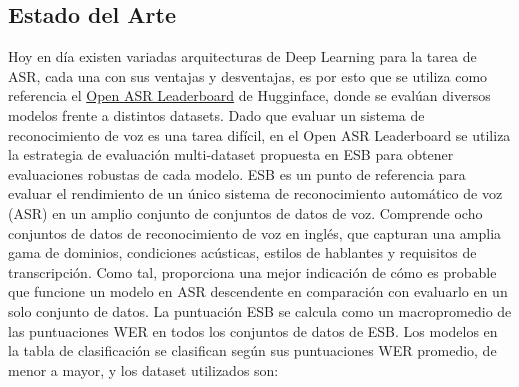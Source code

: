 \documentclass[conference]{IEEEtran}
\begin{document}
\subsection{Estado del Arte}
Hoy en día existen variadas arquitecturas de Deep Learning para la tarea de ASR, cada una con sus ventajas y desventajas, es por esto que se utiliza como referencia el \href{https://huggingface.co/spaces/hf-audio/open_asr_leaderboard}{Open ASR Leaderboard} de Hugginface, donde se evalúan diversos modelos frente a distintos datasets. Dado que evaluar un sistema de reconocimiento de voz es una tarea difícil, en el Open ASR Leaderboard se utiliza la estrategia de evaluación multi-dataset propuesta en ESB \cite{gandhi2022esb} para obtener evaluaciones robustas de cada modelo.
ESB es un punto de referencia para evaluar el rendimiento de un único sistema de reconocimiento automático de voz (ASR) en un amplio conjunto de conjuntos de datos de voz. Comprende ocho conjuntos de datos de reconocimiento de voz en inglés, que capturan una amplia gama de dominios, condiciones acústicas, estilos de hablantes y requisitos de transcripción. Como tal, proporciona una mejor indicación de cómo es probable que funcione un modelo en ASR descendente en comparación con evaluarlo en un solo conjunto de datos.
La puntuación ESB se calcula como un macropromedio de las puntuaciones WER en todos los conjuntos de datos de ESB. Los modelos en la tabla de clasificación se clasifican según sus puntuaciones WER promedio, de menor a mayor, y los dataset utilizados son:
\end{document}
